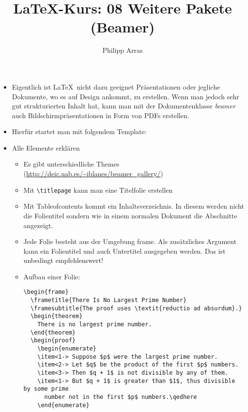 \documentclass[11pt,a4paper]{scrartcl}
\author{Philipp Arras}
\title{\LaTeX -Kurs: 08 Weitere Pakete (Beamer)}
\begin{document}
\maketitle

\begin{itemize}
\item Eigentlich ist \LaTeX\ nicht dazu geeignet Präsentationen oder jegliche Dokumente, wo es auf Design ankommt, zu erstellen. Wenn man jedoch sehr gut strukturierten Inhalt hat, kann man mit der Dokumentenklasse \emph{beamer} auch Bildschirmpräsentationen in Form von PDFs erstellen.
\item Hierfür startet man mit folgendem Template: 
\item Alle Elemente erklären
  \begin{itemize}
    \item Es gibt unterschiedliche Themes (\url{http://deic.uab.es/~iblanes/beamer_gallery/})
    \item Mit \verb|\titlepage| kann man eine Titelfolie erstellen
    \item Mit Tableofcontents kommt ein Inhaltsverzeichnis. In diesem werden nicht die Folientitel sondern wie in einem normalen Dokument die Abschnitte angezeigt.
    \item Jede Folie besteht aus der Umgebung frame. Als zusätzliches Argument kann ein Folientitel und auch Untertitel ausgegeben werden. Das ist unbedingt empfehlenswert!
    \item Aufbau einer Folie:
    \begin{lstlisting}
\begin{frame}
  \frametitle{There Is No Largest Prime Number}
  \framesubtitle{The proof uses \textit{reductio ad absurdum}.}
  \begin{theorem}
    There is no largest prime number.
  \end{theorem}
  \begin{proof}
    \begin{enumerate}
    \item<1-> Suppose $p$ were the largest prime number.
    \item<2-> Let $q$ be the product of the first $p$ numbers.
    \item<3-> Then $q + 1$ is not divisible by any of them.
    \item<1-> But $q + 1$ is greater than $1$, thus divisible by some prime
      number not in the first $p$ numbers.\qedhere
    \end{enumerate}

\end{lstlisting}
\end{itemize}
\end{itemize}
\end{document}
